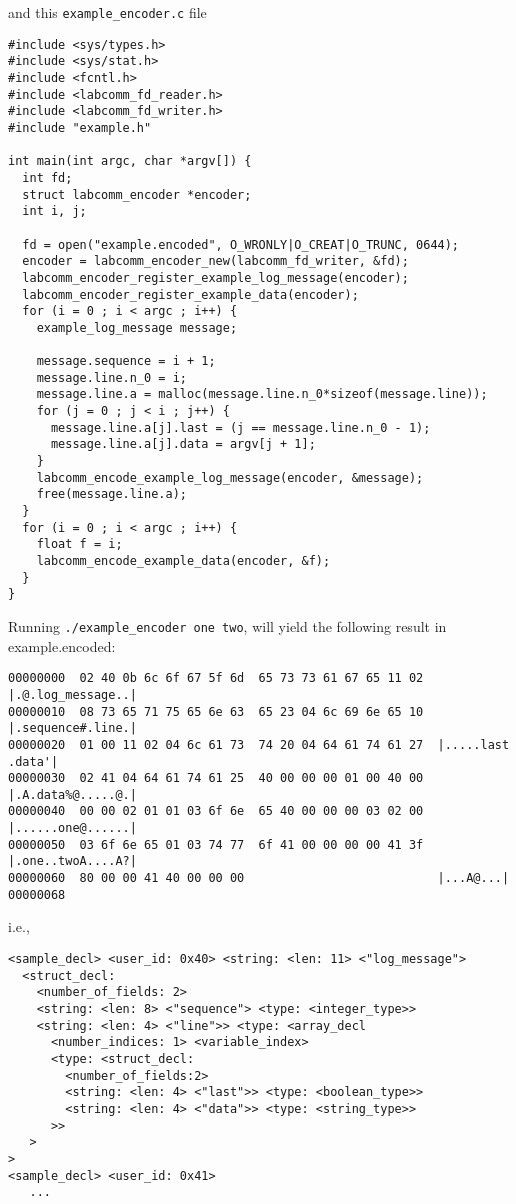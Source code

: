 \documentclass[a4paper]{article}
\begin{document}
and this \verb+example_encoder.c+ file 

\begin{verbatim}
#include <sys/types.h>
#include <sys/stat.h>
#include <fcntl.h>
#include <labcomm_fd_reader.h>
#include <labcomm_fd_writer.h>
#include "example.h"

int main(int argc, char *argv[]) {
  int fd;
  struct labcomm_encoder *encoder;
  int i, j;

  fd = open("example.encoded", O_WRONLY|O_CREAT|O_TRUNC, 0644);
  encoder = labcomm_encoder_new(labcomm_fd_writer, &fd);
  labcomm_encoder_register_example_log_message(encoder);
  labcomm_encoder_register_example_data(encoder);
  for (i = 0 ; i < argc ; i++) {
    example_log_message message;

    message.sequence = i + 1;
    message.line.n_0 = i;
    message.line.a = malloc(message.line.n_0*sizeof(message.line));
    for (j = 0 ; j < i ; j++) {
      message.line.a[j].last = (j == message.line.n_0 - 1);
      message.line.a[j].data = argv[j + 1];
    }
    labcomm_encode_example_log_message(encoder, &message);
    free(message.line.a);
  }
  for (i = 0 ; i < argc ; i++) {
    float f = i;
    labcomm_encode_example_data(encoder, &f);
  }
}
\end{verbatim}

Running \verb+./example_encoder one two+, will yield the following result in example.encoded:


\begin{verbatim}
00000000  02 40 0b 6c 6f 67 5f 6d  65 73 73 61 67 65 11 02  |.@.log_message..|
00000010  08 73 65 71 75 65 6e 63  65 23 04 6c 69 6e 65 10  |.sequence#.line.|
00000020  01 00 11 02 04 6c 61 73  74 20 04 64 61 74 61 27  |.....last .data'|
00000030  02 41 04 64 61 74 61 25  40 00 00 00 01 00 40 00  |.A.data%@.....@.|
00000040  00 00 02 01 01 03 6f 6e  65 40 00 00 00 03 02 00  |......one@......|
00000050  03 6f 6e 65 01 03 74 77  6f 41 00 00 00 00 41 3f  |.one..twoA....A?|
00000060  80 00 00 41 40 00 00 00                           |...A@...|
00000068
\end{verbatim}

i.e.,
\begin{verbatim}
<sample_decl> <user_id: 0x40> <string: <len: 11> <"log_message"> 
  <struct_decl: 
    <number_of_fields: 2>
    <string: <len: 8> <"sequence"> <type: <integer_type>>
    <string: <len: 4> <"line">> <type: <array_decl 
      <number_indices: 1> <variable_index> 
      <type: <struct_decl: 
        <number_of_fields:2>
        <string: <len: 4> <"last">> <type: <boolean_type>> 
        <string: <len: 4> <"data">> <type: <string_type>>
      >>
   >
>
<sample_decl> <user_id: 0x41>
   ...
\end{verbatim}
\end{document}
